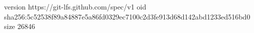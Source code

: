 version https://git-lfs.github.com/spec/v1
oid sha256:5c52538f89a84887e5a86fd0329ec7100c2d3fe913d68d142abd1233ed516bd0
size 26846
